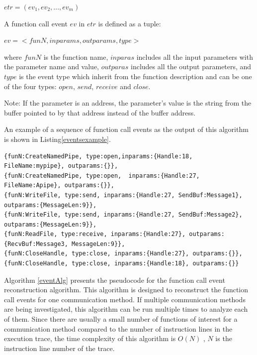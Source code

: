 $etr = (ev_1, ev_2, ..., ev_m)$

A function call event $ev$ in $etr$ is defined as a tuple:

$ev = <funN, inparams, outparams, type>$

where $funN$ is the function name, $inparas$ includes all the input parameters with the parameter name and value, $outparas$ includes all the output parameters, and $type$ is the event type which inherit from the function description and can be one of the four types: $open$, $send$, $receive$ and $close$.

Note: If the parameter is an address, the parameter's value is the string from the buffer pointed to by that address instead of the buffer address.

An example of a sequence of function call events as the output of this algorithm is shown in Listing\ref{eventsexample}.

\begin{lstlisting}[caption= Example of  $etr$, label=eventsexample]
{funN:CreateNamedPipe, type:open,inparams:{Handle:18, FileName:mypipe}, outparams:{}},
{funN:CreateNamedPipe, type:open,  inparams:{Handle:27,  FileName:Apipe}, outparams:{}},
{funN:WriteFile, type:send, inparams:{Handle:27, SendBuf:Message1}, outparams:{MessageLen:9}},
{funN:WriteFile, type:send, inparams:{Handle:27, SendBuf:Message2}, outparams:{MessageLen:9}},
{funN:ReadFile, type:receive, inparams:{Handle:27}, outparams:{RecvBuf:Message3, MessageLen:9}},
{funN:CloseHandle, type:close, inparams:{Handle:27}, outparams:{}},
{funN:CloseHandle, type:close, inparams:{Handle:18}, outparams:{}}
\end{lstlisting}

Algorithm \ref{eventAlg} presents the pseudocode for the function call event reconstruction algorithm. This algorithm is designed to reconstruct the function call events for one communication method. If multiple communication methods are being investigated, this algorithm can be run multiple times to analyze each of them. Since there are usually a small number of functions of interest for a communication method compared to the number of instruction lines in the execution trace, the time complexity of this algorithm is $O(N)$ , $N$ is the instruction line number of the trace. 

